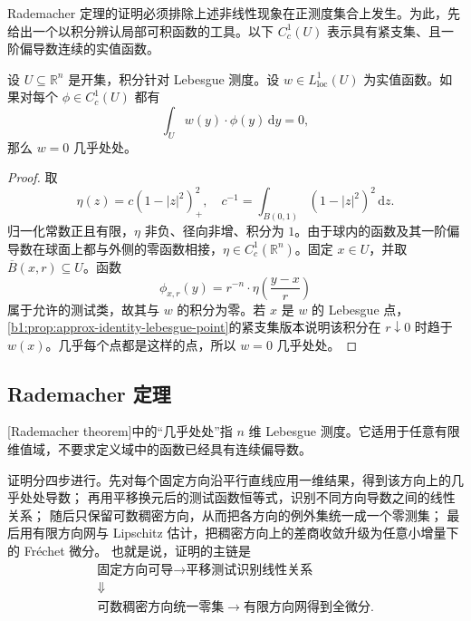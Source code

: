\ProseParagraphBreak

Rademacher 定理的证明必须排除上述非线性现象在正测度集合上发生。为此，先给出一个以积分辨认局部可积函数的工具。以下 \(C_c^1(U)\) 表示具有紧支集、且一阶偏导数连续的实值函数。

\begin{lemma}\label{b1:lem:compact-tests-separate}
设 \(U\subseteq\mathbb R^n\) 是开集，积分针对 Lebesgue 测度。设 \(w\in L^1_{\mathrm{loc}}(U)\) 为实值函数。如果对每个 \(\phi\in C_c^1(U)\) 都有
\[
 \int_U w(y)\cdot\phi(y)\,\mathrm dy=0,
\]
那么 \(w=0\) 几乎处处。
\end{lemma}
\begin{proof}
取
\[
 \eta(z)=c(1-|z|^2)_+^2,
 \quad c^{-1}=\int_{B(0,1)}(1-|z|^2)^2\,\mathrm dz.
\]
归一化常数正且有限，\(\eta\) 非负、径向非增、积分为 \(1\)。由于球内的函数及其一阶偏导数在球面上都与外侧的零函数相接，\(\eta\in C_c^1(\mathbb R^n)\)。固定 \(x\in U\)，并取 \(\overline B(x,r)\subseteq U\)。函数
\[
 \phi_{x,r}(y)=r^{-n}\cdot \eta\left(\frac{y-x}r\right)
\]
属于允许的测试类，故其与 \(w\) 的积分为零。若 \(x\) 是 \(w\) 的 Lebesgue 点，\cref{b1:prop:approx-identity-lebesgue-point}的紧支集版本说明该积分在 \(r\downarrow0\) 时趋于 \(w(x)\)。几乎每个点都是这样的点，所以 \(w=0\) 几乎处处。
\end{proof}

\subsection{Rademacher 定理}
\label{b1:subsec:160203}

[Rademacher theorem]中的“几乎处处”指 \(n\) 维 Lebesgue 测度。它适用于任意有限维值域，不要求定义域中的函数已经具有连续偏导数。

\ProseParagraphBreak

证明分四步进行。先对每个固定方向沿平行直线应用一维结果，得到该方向上的几乎处处导数；
再用平移换元后的测试函数恒等式，识别不同方向导数之间的线性关系；
随后只保留可数稠密方向，从而把各方向的例外集统一成一个零测集；
最后用有限方向网与 Lipschitz 估计，把稠密方向上的差商收敛升级为任意小增量下的 Fr\'echet 微分。
也就是说，证明的主链是
\[
 \begin{gathered}
 \text{固定方向可导}
 \longrightarrow \text{平移测试识别线性关系}\\
 \Downarrow\\
 \text{可数稠密方向统一零集}
 \longrightarrow \text{有限方向网得到全微分}.
 \end{gathered}
\]

